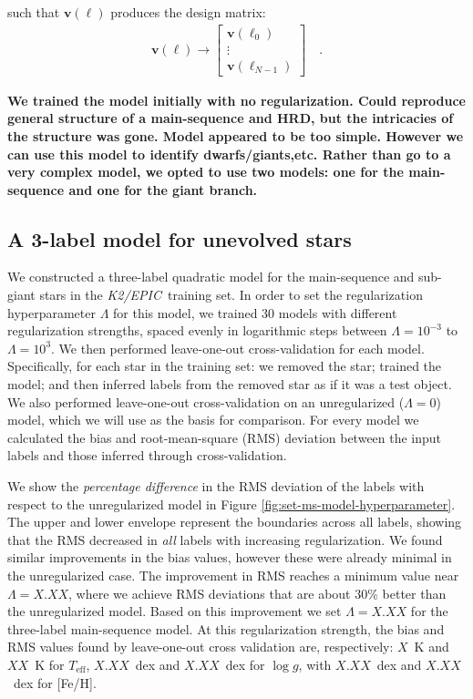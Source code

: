 \documentclass[preprint,trackchanges]{aastex}
\newcommand{\project}[1]{\textsl{#1}}
\newcommand{\epic}{\project{K2/EPIC}}
\newcommand{\stub}[1]{{\color{blue} \textbf{#1}}}
\newcommand{\teff}{T_{\mathrm{eff}}}
\newcommand{\logg}{\log g}
\newcommand{\Dvector}[1]{\boldsymbol{#1}}
\newcommand{\vecv}{\Dvector{v}}
\begin{document}
\noindent{}such that $\vecv(\ell)$ produces the design matrix:
\begin{eqnarray}
	\vecv(\ell) \rightarrow \begin{bmatrix} \vecv(\ell_0) \\ \vdots \\ \vecv(\ell_{N-1}) \end{bmatrix} \quad .
\end{eqnarray}

\stub{We trained the model initially with no regularization. Could reproduce general structure of a main-sequence and HRD, but the intricacies of the structure was gone. Model appeared to be too simple.  However we can use this model to identify dwarfs/giants,etc. Rather than go to a very complex model, we opted to use two models: one for the main-sequence and one for the giant branch.}


\subsection{A 3-label model for unevolved stars}
\label{sec:the-ms-model}

We constructed a three-label quadratic model for the main-sequence and sub-giant
stars in the \epic\ training set.  In order to set the regularization hyperparameter
$\Lambda$ for this model, we trained 30 models with different regularization strengths,
spaced evenly in logarithmic steps between $\Lambda = 10^{-3}$ to $\Lambda = 10^{3}$.
We then performed leave-one-out cross-validation for each model.  Specifically, for 
each star in the training set: we removed the star; trained the model; and then 
inferred labels from the removed star as if it was a test object. We also performed 
leave-one-out cross-validation on an unregularized ($\Lambda = 0$) model, which we 
will use as the basis for comparison.  For every model we calculated the bias and
root-mean-square (RMS) deviation between the input labels and those inferred through
cross-validation. 


We show the \emph{percentage difference} in the RMS deviation of the labels with respect
to the unregularized model in Figure \ref{fig:set-ms-model-hyperparameter}.  The upper 
and lower envelope represent the boundaries across all labels, showing that the RMS
decreased in \emph{all} labels with increasing regularization.  We found similar
improvements in the bias values, however these were already minimal in the unregularized
case.  The improvement in RMS reaches a minimum value near $\Lambda = X.XX$, where
we achieve RMS deviations that are about 30\% better than the unregularized model.
Based on this improvement we set $\Lambda = X.XX$ for the three-label main-sequence model.
At this regularization strength, the bias and RMS values found by leave-one-out
cross validation are, respectively: $X$~K and $XX$~K for $\teff$, $X.XX$~dex and $X.XX$~dex
for $\logg$, with $X.XX$~dex and $X.XX$~dex for [Fe/H].
\end{document}
